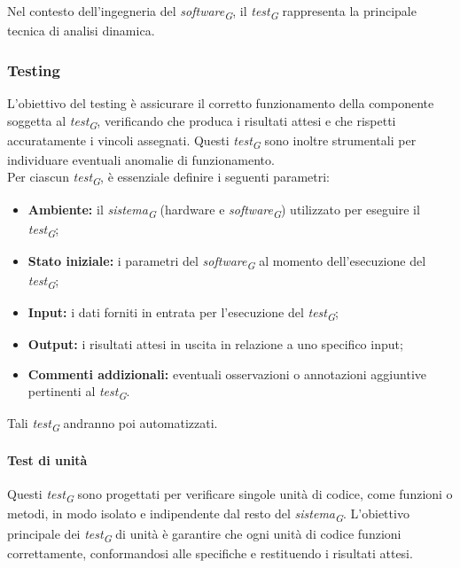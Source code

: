 Nel contesto dell'ingegneria del \textit{software}\textsubscript{\textit{G}}, il \textit{test}\textsubscript{\textit{G}} rappresenta la principale tecnica di analisi dinamica.

\subsubsection{Testing}
\label{subsubsec:Testing}
L'obiettivo del testing è assicurare il corretto funzionamento della componente soggetta al \textit{test}\textsubscript{\textit{G}}, verificando che produca i risultati attesi e che rispetti accuratamente i vincoli assegnati. Questi \textit{test}\textsubscript{\textit{G}} sono inoltre strumentali per individuare eventuali anomalie di funzionamento. \\
Per ciascun \textit{test}\textsubscript{\textit{G}}, è essenziale definire i seguenti parametri:

\begin{itemize}
    \item \textbf{Ambiente:} 
        il \textit{sistema}\textsubscript{\textit{G}} (hardware e \textit{software}\textsubscript{\textit{G}}) utilizzato per eseguire il \textit{test}\textsubscript{\textit{G}};
    \item \textbf{Stato iniziale:} 
        i parametri del \textit{software}\textsubscript{\textit{G}} al momento dell'esecuzione del \textit{test}\textsubscript{\textit{G}};
    \item \textbf{Input:} 
        i dati forniti in entrata per l'esecuzione del \textit{test}\textsubscript{\textit{G}};
    \item \textbf{Output:} 
        i risultati attesi in uscita in relazione a uno specifico input;
    \item \textbf{Commenti addizionali:} 
        eventuali osservazioni o annotazioni aggiuntive pertinenti al \textit{test}\textsubscript{\textit{G}}.
\end{itemize}
Tali \textit{test}\textsubscript{\textit{G}} andranno poi automatizzati. 

\paragraph{Test di unità}
Questi \textit{test}\textsubscript{\textit{G}} sono progettati per verificare singole unità di codice, come funzioni o metodi, in modo isolato e indipendente dal resto del \textit{sistema}\textsubscript{\textit{G}}. L'obiettivo principale dei \textit{test}\textsubscript{\textit{G}} di unità è garantire che ogni unità di codice funzioni correttamente, conformandosi alle specifiche e restituendo i risultati attesi.

